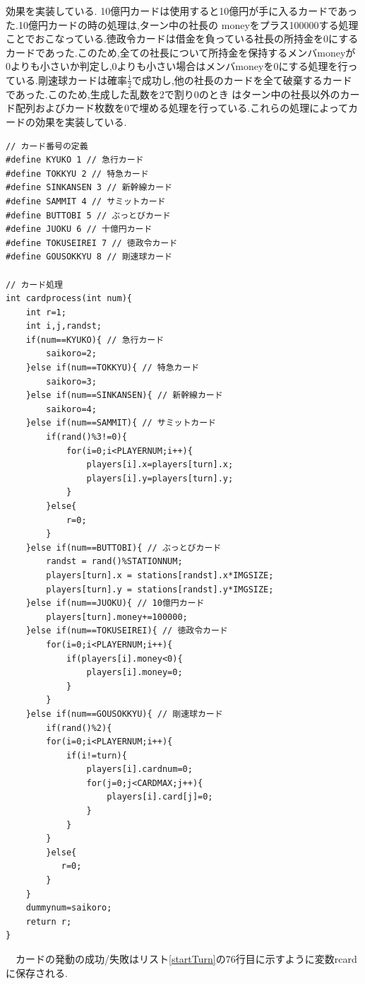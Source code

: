 \documentclass[a4j]{jarticle}
\begin{document}
        効果を実装している. 10億円カードは使用すると10億円が手に入るカードであった.10億円カードの時の処理は,ターン中の社長の
        moneyをプラス100000する処理ことでおこなっている.徳政令カードは借金を負っている社長の所持金を0にするカードであった.このため,全ての社長について所持金を保持するメンバmoneyが
        0よりも小さいか判定し,0よりも小さい場合はメンバmoneyを0にする処理を行っている.剛速球カードは確率$\frac{1}{2}$で成功し,他の社長のカードを全て破棄するカードであった.このため,生成した乱数を2で割り0のとき
        はターン中の社長以外のカード配列およびカード枚数を0で埋める処理を行っている.これらの処理によってカードの効果を実装している.
        \begin{lstlisting}[basicstyle=\ttfamily\footnotesize, frame=single,label=cardprocess,caption=cardprocess関数]
// カード番号の定義
#define KYUKO 1 // 急行カード
#define TOKKYU 2 // 特急カード
#define SINKANSEN 3 // 新幹線カード
#define SAMMIT 4 // サミットカード 
#define BUTTOBI 5 // ぶっとびカード
#define JUOKU 6 // 十億円カード
#define TOKUSEIREI 7 // 徳政令カード
#define GOUSOKKYU 8 // 剛速球カード

// カード処理
int cardprocess(int num){
    int r=1;
    int i,j,randst;
    if(num==KYUKO){ // 急行カード
        saikoro=2;
    }else if(num==TOKKYU){ // 特急カード
        saikoro=3;
    }else if(num==SINKANSEN){ // 新幹線カード
        saikoro=4;
    }else if(num==SAMMIT){ // サミットカード
        if(rand()%3!=0){
            for(i=0;i<PLAYERNUM;i++){
                players[i].x=players[turn].x;
                players[i].y=players[turn].y;
            }
        }else{
            r=0;
        }
    }else if(num==BUTTOBI){ // ぶっとびカード
        randst = rand()%STATIONNUM;
        players[turn].x = stations[randst].x*IMGSIZE;
        players[turn].y = stations[randst].y*IMGSIZE;
    }else if(num==JUOKU){ // 10億円カード
        players[turn].money+=100000;
    }else if(num==TOKUSEIREI){ // 徳政令カード
        for(i=0;i<PLAYERNUM;i++){
            if(players[i].money<0){
                players[i].money=0;
            }
        }
    }else if(num==GOUSOKKYU){ // 剛速球カード
        if(rand()%2){
        for(i=0;i<PLAYERNUM;i++){
            if(i!=turn){
                players[i].cardnum=0;
                for(j=0;j<CARDMAX;j++){
                    players[i].card[j]=0;
                }
            }
        }
        }else{
           r=0; 
        }        
    }
    dummynum=saikoro;
    return r;
}
        \end{lstlisting}   
        　カードの発動の成功/失敗はリスト\ref{startTurn}の76行目に示すように変数rcardに保存される.
\end{document}
